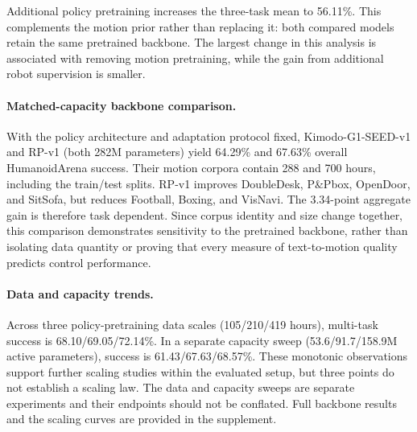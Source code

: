 Additional policy pretraining increases the three-task mean to 56.11\%. This complements the motion prior rather than replacing it: both compared models retain the same pretrained backbone. The largest change in this analysis is associated with removing motion pretraining, while the gain from additional robot supervision is smaller.


\paragraph{Matched-capacity backbone comparison.}
With the policy architecture and adaptation protocol fixed, Kimodo-G1-SEED-v1 and RP-v1 (both 282M parameters) yield 64.29\% and 67.63\% overall HumanoidArena success. Their motion corpora contain 288 and 700 hours, including the train/test splits. RP-v1 improves DoubleDesk, P\&Pbox, OpenDoor, and SitSofa, but reduces Football, Boxing, and VisNavi. The 3.34-point aggregate gain is therefore task dependent. Since corpus identity and size change together, this comparison demonstrates sensitivity to the pretrained backbone, rather than isolating data quantity or proving that every measure of text-to-motion quality predicts control performance.

\paragraph{Data and capacity trends.}
Across three policy-pretraining data scales (105/210/419 hours), multi-task success is 68.10/69.05/72.14\%. In a separate capacity sweep (53.6/91.7/158.9M active parameters), success is 61.43/67.63/68.57\%. These monotonic observations support further scaling studies within the evaluated setup, but three points do not establish a scaling law. The data and capacity sweeps are separate experiments and their endpoints should not be conflated. Full backbone results and the scaling curves are provided in the supplement.
